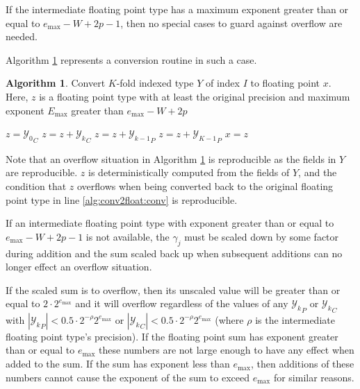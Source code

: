 \documentclass[12pt]{article}
\providecommand{\max}{\ensuremath{\text{max}}}
\providecommand{\To}{\ensuremath{\text{ to }}}
\theoremstyle{definition}
\newtheorem{alg}{Algorithm}[section]
\numberwithin{equation}{section}
\numberwithin{figure}{section}
\begin{document}
    If the intermediate floating point type has a maximum exponent greater than or equal to $e_{\max} - W + 2  p - 1$, then no special cases to guard against overflow are needed.

    Algorithm \ref{alg:conv2float} represents a conversion routine in such a case.

    \begin{samepage}
    \begin{alg}
      Convert $K$-fold indexed type $Y$ of index $I$ to floating point $x$. Here, $z$ is a floating point type with at least the original precision and maximum exponent $E_{\max}$ greater than $e_{\max} - W + 2  p$
      \begin{algorithmic}[1]
          \State $z = {\mathcal{Y}_0}_C$
          \For{$k = 1 \To K - 1$}
            \State $z = z + {\mathcal{Y}_k}_C$
            \State $z = z + {\mathcal{Y}_{k - 1}}_P$
          \EndFor
          \State $z = z + {\mathcal{Y}_{K - 1}}_P$
          \State $x = z$ \label{alg:conv2float:conv}
        \EndFunction
      \end{algorithmic}
      \label{alg:conv2float}
    \end{alg}
    \end{samepage}

    Note that an overflow situation in Algorithm \ref{alg:conv2float} is reproducible as the fields in $Y$ are reproducible. $z$ is deterministically computed from the fields of $Y$, and the condition that $z$ overflows when being converted back to the original floating point type in line \ref{alg:conv2float:conv} is reproducible.

    If an intermediate floating point type with exponent greater than or equal to $e_{\max} - W + 2  p - 1$ is not available, the $\gamma_j$ must be scaled down by some factor during addition and the sum scaled back up when subsequent additions can no longer effect an overflow situation.

    If the scaled sum is to overflow, then its unscaled value will be greater than or equal to $2 \cdot 2^{e_{\max}}$ and it will overflow regardless of the values of any ${\mathcal{Y}_k}_P$ or ${\mathcal{Y}_k}_C$ with $|{\mathcal{Y}_k}_P| < 0.5 \cdot 2^{-\rho} 2^{e_{\max}}$ or $|{\mathcal{Y}_k}_C| < 0.5 \cdot 2^{-\rho}2^{e_{\max}}$ (where $\rho$ is the intermediate floating point type's precision). If the floating point sum has exponent greater than or equal to $e_{\max}$ these numbers are not large enough to have any effect when added to the sum. If the sum has exponent less than $e_{\max}$, then additions of these numbers cannot cause the exponent of the sum to exceed $e_{\max}$ for similar reasons.
\end{document}

